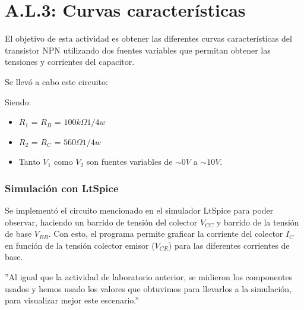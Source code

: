 \thispagestyle{fancy}
\section{A.L.3: Curvas características}

\sangria{} El objetivo de esta actividad es obtener las diferentes curvas características del transistor NPN utilizando dos fuentes variables que permitan obtener las tensiones y corrientes del capacitor.

\sangria{} Se llevó a cabo este circuito:
\begin{center}
\end{center}
Siendo:
\begin{itemize}[nosep]
    \item $R_1$ = $R_B$ = $100k\Omega${\small $1/4w$}
    \item $R_2$ = $R_C$ = $560\Omega${\small $1/4w$}
    \item Tanto $V_1$ como $V_2$ son fuentes variables de $\sim 0V$ a $\sim 10V$.
\end{itemize}
\subsubsection{Simulación con LtSpice}
\sangria{} Se implementó el circuito mencionado en el simulador LtSpice para poder observar, haciendo un barrido de tensión del colector $V_{CC}$ y barrido de la tensión de base $V_{BB}$. Con esto, el programa permite graficar la corriente del colector $I_C$ en función de la tensión colector emisor ($V_{CE}$) para las diferentes corrientes de base.

''Al igual que la actividad de laboratorio anterior, se midieron los componentes usados y hemos usado los valores que obtuvimos para llevarlos a la simulación, para visualizar mejor este escenario.''
\newpage
